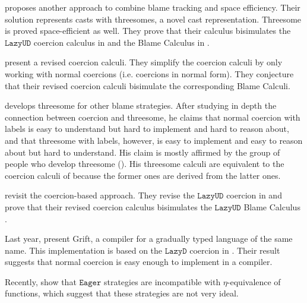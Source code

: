 \documentclass[acmsmall,review,anonymous]{acmart}\settopmatter{printfolios=true,printccs=false,printacmref=false}
\newcommand{\lazyUD}{$\mathtt{Lazy UD}$}
\newcommand{\lazyD}{$\mathtt{Lazy D}$}
\newcommand{\eager}{$\mathtt{Eager}$}
\begin{document}
\citet{siek2010threesomes} proposes another approach to combine blame 
tracking and space efficiency. Their solution represents casts with threesomes, 
a novel cast representation. Threesome is proved space-efficient as well.
They prove that their calculus bisimulates the \lazyUD{} coercion 
calculus in \citet{siek2009exploring} and the Blame Calculus in 
\citet{wadler2009well}.

\citet{siek2012interpretations} present a revised coercion calculi.
They simplify the coercion calculi by only 
working with normal coercions (i.e. coercions in normal form). 
They conjecture that their revised coercion calculi bisimulate the 
corresponding Blame Calculi.

\citet{garcia2013calculating} develops
threesome for other blame strategies. After studying in depth the connection 
between coercion and threesome,
he claims that normal coercion with labels is easy to understand but hard to 
implement and hard to reason about, and that 
threesome with labels, however, is easy to implement and easy to reason about 
but hard to understand. 
His claim is mostly affirmed by the group of people who develop threesome 
(\citet{siek2015blame}).
His threesome calculi are equivalent to the coercion calculi of
\citet{siek2009exploring} because the former ones are derived from the latter 
ones.

\citet{siek2015blame} revisit the coercion-based approach. They revise
the \lazyUD{} coercion in \citet{siek2012interpretations} and prove
that their revised coercion calculus bisimulates the \lazyUD{} Blame
Calculus \citet{wadler2009well}.

Last year, \citet{kuhlenschmidt2018efficient} present Grift, a compiler for a 
gradually typed language of the same name. 
This implementation is based on the \lazyD{} coercion in 
\citet{siek2012interpretations}.
Their result suggests that normal coercion is easy enough to implement in a 
compiler. 

Recently, \citet{new2019gradual} show that \eager{} strategies are 
incompatible with $\eta$-equivalence of functions, which suggest that these 
strategies are not very ideal. 
\end{document}
